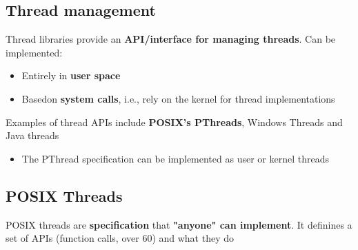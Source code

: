 \documentclass{article}
\begin{document}
\subsection{Thread management}
\begin{flushleft}
Thread libraries provide an \textbf{API/interface for managing threads}. Can be implemented:
\begin{itemize}
	\item Entirely in \textbf{user space}
	\item Basedon \textbf{system calls}, i.e., rely on the kernel for thread implementations
\end{itemize}
Examples of thread APIs include \textbf{POSIX's PThreads}, Windows Threads and Java threads
\begin{itemize}
	\item The PThread specification can be implemented as user or kernel threads
\end{itemize}
\end{flushleft}

\subsection{POSIX Threads}
\begin{flushleft}
	POSIX threads are \textbf{specification} that \textbf{"anyone" can implement}. It definines a set of APIs (function calls, over 60) and what they do
\end{flushleft}
\end{document}
